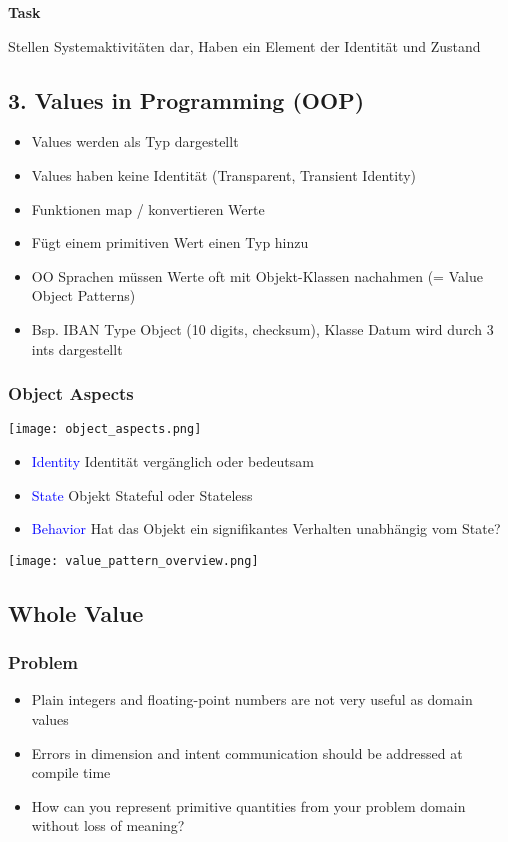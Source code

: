 \textbf{Task}

Stellen Systemaktivitäten dar, Haben ein Element der Identität und Zustand

\vfill\null

\subsection{3. Values in Programming (OOP)}

\begin{itemize}
    \item Values werden als Typ dargestellt
    \item Values haben keine Identität (Transparent, Transient Identity)
    \item Funktionen map / konvertieren Werte
    \item Fügt einem primitiven Wert einen Typ hinzu
    \item OO Sprachen müssen Werte oft mit Objekt-Klassen nachahmen (= Value Object Patterns)
    \item Bsp. IBAN Type Object (10 digits, checksum), Klasse Datum wird durch 3 ints dargestellt
\end{itemize}

\subsubsection{Object Aspects}
\texttt{[image: object\_aspects.png]}

\begin{itemize}
    \item \textcolor{blue}{Identity} Identität vergänglich oder bedeutsam
    \item \textcolor{blue}{State} Objekt Stateful oder Stateless
    \item \textcolor{blue}{Behavior} Hat das Objekt ein signifikantes Verhalten unabhängig vom State?
\end{itemize}

\texttt{[image: value\_pattern\_overview.png]}

\subsection{Whole Value}
\subsubsection{Problem}
\begin{itemize}
    \item Plain integers and floating-point numbers are not very useful as domain values
    \item Errors in dimension and intent communication should be addressed at compile time
    \item How can you represent primitive quantities from your problem domain without loss of meaning?
\end{itemize}

